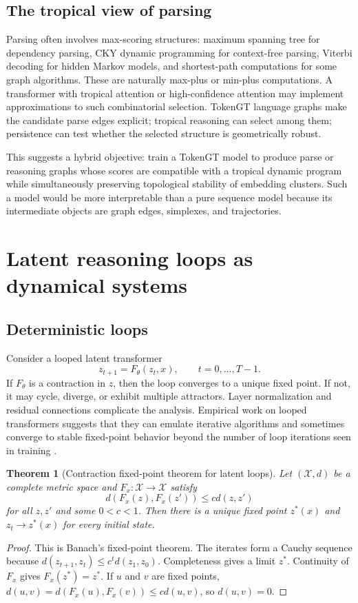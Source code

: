 \documentclass[11pt]{article}
\newtheorem{theorem}[definition]{Theorem}
\newcommand{\calX}{\mathcal{X}}
\newcommand{\1}{\mathbf{1}}
\begin{document}
\subsection{The tropical view of parsing}

Parsing often involves max-scoring structures: maximum spanning tree for dependency parsing, CKY dynamic programming for context-free parsing, Viterbi decoding for hidden Markov models, and shortest-path computations for some graph algorithms. These are naturally max-plus or min-plus computations. A transformer with tropical attention or high-confidence attention may implement approximations to such combinatorial selection. TokenGT language graphs make the candidate parse edges explicit; tropical reasoning can select among them; persistence can test whether the selected structure is geometrically robust.

This suggests a hybrid objective: train a TokenGT model to produce parse or reasoning graphs whose scores are compatible with a tropical dynamic program while simultaneously preserving topological stability of embedding clusters. Such a model would be more interpretable than a pure sequence model because its intermediate objects are graph edges, simplexes, and trajectories.

\section{Latent reasoning loops as dynamical systems}

\subsection{Deterministic loops}

Consider a looped latent transformer
\[
z_{t+1}=F_\theta(z_t,x),\qquad t=0,\ldots,T-1.
\]
If $F_\theta$ is a contraction in $z$, then the loop converges to a unique fixed point. If not, it may cycle, diverge, or exhibit multiple attractors. Layer normalization and residual connections complicate the analysis. Empirical work on looped transformers suggests that they can emulate iterative algorithms and sometimes converge to stable fixed-point behavior beyond the number of loop iterations seen in training \cite{YangLooped2024,Saunshi2025}.

\begin{theorem}[Contraction fixed-point theorem for latent loops]
Let $(\calX,d)$ be a complete metric space and $F_x:\calX\to\calX$ satisfy
\[
d(F_x(z),F_x(z'))\le c d(z,z')
\]
for all $z,z'$ and some $0<c<1$. Then there is a unique fixed point $z^*(x)$ and $z_t\to z^*(x)$ for every initial state.
\end{theorem}
\begin{proof}
This is Banach's fixed-point theorem. The iterates form a Cauchy sequence because $d(z_{t+1},z_t)\le c^t d(z_1,z_0)$. Completeness gives a limit $z^*$. Continuity of $F_x$ gives $F_x(z^*)=z^*$. If $u$ and $v$ are fixed points, $d(u,v)=d(F_x(u),F_x(v))\le c d(u,v)$, so $d(u,v)=0$.
\end{proof}
\end{document}
